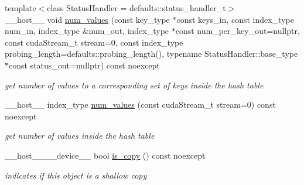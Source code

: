 \begin{DoxyCompactItemize}
{\footnotesize template$<$class Status\+Handler  = defaults\+::status\+\_\+handler\+\_\+t$>$ }\\\+\_\+\+\_\+host\+\_\+\+\_\+ void \hyperlink{classwarpcore_1_1BucketListHashTable_aecd4801b9f1e6915f74c106a9d71e0f4}{num\+\_\+values} (const key\+\_\+type $\ast$const keys\+\_\+in, const index\+\_\+type num\+\_\+in, index\+\_\+type \&num\+\_\+out, index\+\_\+type $\ast$const num\+\_\+per\+\_\+key\+\_\+out=nullptr, const cuda\+Stream\+\_\+t stream=0, const index\+\_\+type probing\+\_\+length=defaults\+::probing\+\_\+length(), typename Status\+Handler\+::base\+\_\+type $\ast$const status\+\_\+out=nullptr) const noexcept
\begin{DoxyCompactList}\small\item\em get number of values to a corresponding set of keys inside the hash table \end{DoxyCompactList}\item 
\+\_\+\+\_\+host\+\_\+\+\_\+ index\+\_\+type \hyperlink{classwarpcore_1_1BucketListHashTable_a872b991005419699dfb39d873b950f18}{num\+\_\+values} (const cuda\+Stream\+\_\+t stream=0) const noexcept
\begin{DoxyCompactList}\small\item\em get number of values inside the hash table \end{DoxyCompactList}\item 
\+\_\+\+\_\+host\+\_\+\+\_\+\+\_\+\+\_\+device\+\_\+\+\_\+ bool \hyperlink{classwarpcore_1_1BucketListHashTable_a21b8552468f9254a2e7d5f81b0d0e29c}{is\+\_\+copy} () const noexcept
\begin{DoxyCompactList}\small\item\em indicates if this object is a shallow copy \end{DoxyCompactList}\end{DoxyCompactItemize}
